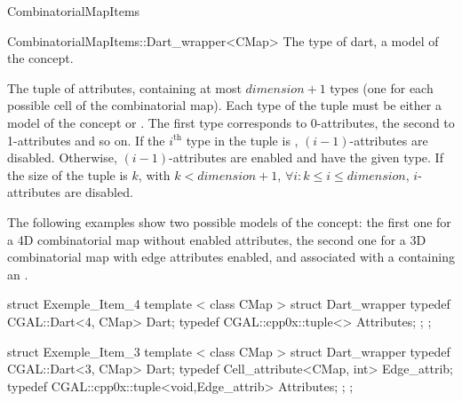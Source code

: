 \begin{ccRefConcept}{CombinatorialMapItems}
\begin{ccClass}{CombinatorialMapItems::Dart_wrapper<CMap>}
    {The type of dart, a model of the  concept.}

{The tuple of attributes, containing at most
  $dimension+1$ types (one for each possible cell of the combinatorial
  map).  Each type of the tuple must be either a model of the
   concept or .
  The first type corresponds to 0-attributes, 
  the second to 1-attributes and so on. 
  If the $i^{\mbox{th}}$ type in the tuple is , 
  $(i-1)$-attributes are disabled. Otherwise, $(i-1)$-attributes are enabled and
  have the given type.  If the size of the tuple is $k$,
  with $k < dimension+1$, $\forall i: k \leq i \leq dimension$,
  $i$-attributes are disabled.}
\end{ccClass}

\ccExample
The following examples show two possible models of the
 concept: the first one for a 4D
combinatorial map without enabled attributes, the second one for a 3D
combinatorial map with edge attributes enabled, and associated with a
 containing an .

\begin{ccExampleCode}
struct Exemple_Item_4
{
   template < class CMap >
   struct Dart_wrapper
   {
     typedef CGAL::Dart<4, CMap> Dart;
     typedef CGAL::cpp0x::tuple<> Attributes;
   };
};
\end{ccExampleCode}

\begin{ccExampleCode}
struct Exemple_Item_3
{
   template < class CMap >
   struct Dart_wrapper
   {
     typedef CGAL::Dart<3, CMap> Dart;
     typedef Cell_attribute<CMap, int> Edge_attrib;
     typedef CGAL::cpp0x::tuple<void,Edge_attrib> Attributes;
   };
};
\end{ccExampleCode}    

\ccHasModels
{}

\ccSeeAlso
\\

\end{ccRefConcept}
\ccRefPageEnd

